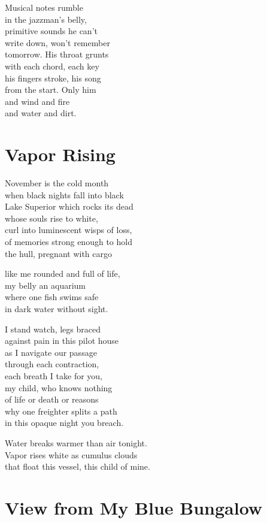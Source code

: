 \documentclass[twoside,10pt]{book}
\begin{document}
Musical notes rumble\\
in the jazzman's belly,\\
primitive sounds he can't\\
write down, won't remember\\
tomorrow. His throat grunts\\
with each chord, each key\\
his fingers stroke, his song\\
from the start. Only him\\
and wind and fire\\
and water and dirt.


\clearpage
\section{Vapor Rising}

November is the cold month\\
when black nights fall into black\\
Lake Superior which rocks its dead\\
whose souls rise to white,\\
curl into luminescent wisps of loss,\\
of memories strong enough to hold\\
the hull, pregnant with cargo

like me rounded and full of life,\\
my belly an aquarium\\
where one fish swims safe\\
in dark water without sight.

I stand watch, legs braced\\
against pain in this pilot house\\
as I navigate our passage\\
through each contraction,\\
each breath I take for you,\\
my child, who knows nothing\\
of life or death or reasons\\
why one freighter splits a path\\
in this opaque night you breach.

Water breaks warmer than air tonight.\\
Vapor rises white as cumulus clouds\\
that float this vessel, this child of mine.


\clearpage
\section{View from My Blue Bungalow}
\end{document}
